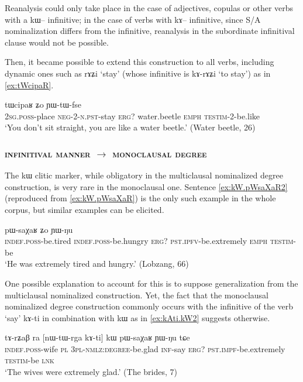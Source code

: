 \documentclass[oldfontcommands,oneside,a4paper,11pt]{article}
\newcommand{\ipa}[1]{{\phon #1}} %
\begin{document}
Reanalysis could only take place in the case of adjectives, copulas or other verbs with a \ipa{kɯ--} infinitive; in the case of verbs with \ipa{kɤ--} infinitive, since S/A nominalization differs from the infinitive, reanalysis in the subordinate infinitival clause would not be possible. 

Then, it became possible to extend this construction to all verbs, including dynamic ones such as \ipa{rɤʑi} `stay' (whose infinitive is \ipa{kɤ-rɤʑi} `to stay') as in \ref{ex:tWcipaR}.

  \begin{exe}
\ex \label{ex:tWcipaR}
\gll 
[\ipa{nɤ-stu}  	\ipa{mɤ-tɯ-rɤʑi}]  	\ipa{kɯ}  	\ipa{tɯcipaʁ}  	\ipa{ʑo}  	\ipa{ɲɯ-tɯ-fse}  \\
\textsc{2sg.poss}-place \textsc{neg-2-n.pst}-stay \textsc{erg?} water.beetle \textsc{emph} \textsc{testim}-2-be.like \\
\glt `You don't sit straight, you are like a water beetle.'  (Water beetle, 26)
 \end{exe}
 
 
 \subsubsection{ \textsc{infinitival manner} $\rightarrow$  \textsc{monoclausal degree}} \label{sec:manner2adj}
The  \ipa{kɯ} clitic marker, while obligatory in the multiclausal nominalized degree construction, is very rare in the monoclausal one. Sentence \ref{ex:kW.pWsaXaR2}  (reproduced from \ref{ex:kW.pWsaXaR}) is the only such example in the whole corpus, but similar examples can be elicited.

      \begin{exe}
  \ex  \label{ex:kW.pWsaXaR2}  
  \gll 
   [\ipa{tɤ-ɣɲat}  	\ipa{tɤ-mtsɯr}]  	\ipa{kɯ}  	\ipa{pɯ-saχaʁ}  	\ipa{ʑo}  	\ipa{ɲɯ-ŋu}  \\
      \textsc{indef.poss}-be.tired     \textsc{indef.poss}-be.hungry \textsc{erg?} \textsc{pst.ipfv}-be.extremely \textsc{emph} \textsc{testim}-be \\
      \glt `He was extremely tired and hungry.' (Lobzang, 66)
   \end{exe} 

One possible explanation to account for this is to suppose generalization from the multiclausal nominalized construction. Yet, the fact that the monoclausal nominalized degree construction commonly occurs with the infinitive of the verb `say' \ipa{kɤ-ti} in combination with   \ipa{kɯ} as in \ref{ex:kAti.kW2}  suggests otherwise.
      \begin{exe}
  \ex  \label{ex:kAti.kW2}  
  \gll 
\ipa{tɤ-rʑaβ} 	\ipa{ra} 	 	[\ipa{nɯ-tɯ-rga} 	\ipa{kɤ-ti}] 	\ipa{kɯ} 	\ipa{pɯ-saχaʁ} 	\ipa{ɲɯ-ŋu} 	\ipa{tɕe} \\
\textsc{indef.poss}-wife \textsc{pl} \textsc{3pl-nmlz:degree}-be.glad \textsc{inf}-say \textsc{erg?} \textsc{pst.impf}-be.extremely \textsc{testim}-be \textsc{lnk} \\
\glt `The wives were extremely glad.' (The brides, 7)
   \end{exe} 
   
\end{document}
